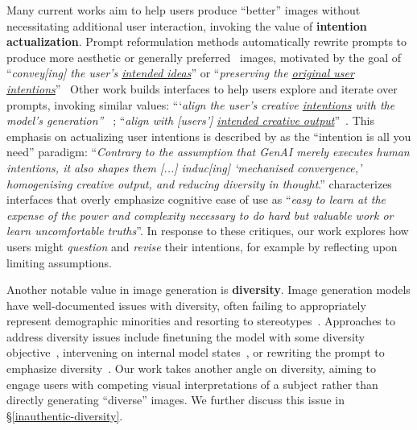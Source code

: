 
Many current works aim to help users produce ``better'' images without necessitating additional user interaction, invoking the value of \textbf{intention actualization}.
Prompt reformulation methods automatically rewrite prompts to produce more aesthetic or generally preferred~\cite{zhan2024capability, xu2024imagereward, datta-etal-2024-prompt, chen2024tailored} images, motivated by the goal of ``\textit{convey[ing] the user’s \underline{intended ideas}}''\cite{mo2024dynamicpromptoptimizingtexttoimage} or ``\textit{preserving the \underline{original user intentions}}''~\cite{hao2024optimizing}
Other work builds interfaces to help users explore and iterate over prompts, invoking similar values:
```\textit{align the user’s creative \underline{intentions} with the model’s generation'' }~\cite{wang2024promptcharm};
``\textit{align with [users'] \underline{intended creative output}}''~\cite{brade2023promptify}.
This emphasis on actualizing user intentions is described by \citet{sarkar2024intention} as the ``intention is all you need'' paradigm: ``\textit{Contrary to the assumption that GenAI merely executes human intentions, it also shapes them [...] induc[ing] `mechanised convergence,' homogenising creative output, and reducing diversity in thought}.''
\citet{cai2024antagonisticai} characterizes interfaces that overly emphasize cognitive ease of use as ``\textit{easy to learn at the expense of the power and complexity necessary to do hard but valuable work or learn uncomfortable truths}''.
In response to these critiques, our work explores how users might \textit{question} and \textit{revise} their intentions, for example by reflecting upon limiting assumptions. 

Another notable value in image generation is \textbf{diversity}.
Image generation models have well-documented issues with diversity, often failing to appropriately represent demographic minorities and resorting to stereotypes~\citep[\textit{inter alia}]{ali2024demographic, wang-etal-2023-t2iat, wang2024newjob, chauhan2024identifying, naik2023t2i}.
Approaches to address diversity issues include finetuning the model with some diversity objective~\cite{miao2024training, esposito2023mitigatingstereotypicalbiasestext}, intervening on internal model states~\cite{friedrich2023fairdiffusioninstructingtexttoimage, zhang2023iti, zameshina2023diversediffusionenhancingimage, chuang2023debiasingvisionlanguagemodelsbiased}, or rewriting the prompt to emphasize diversity~\cite{microsoft_prompt_transformation}.
Our work takes another angle on diversity, aiming to engage users with competing visual interpretations of a subject rather than directly generating ``diverse'' images. We further discuss this issue in \S\ref{inauthentic-diversity}.

